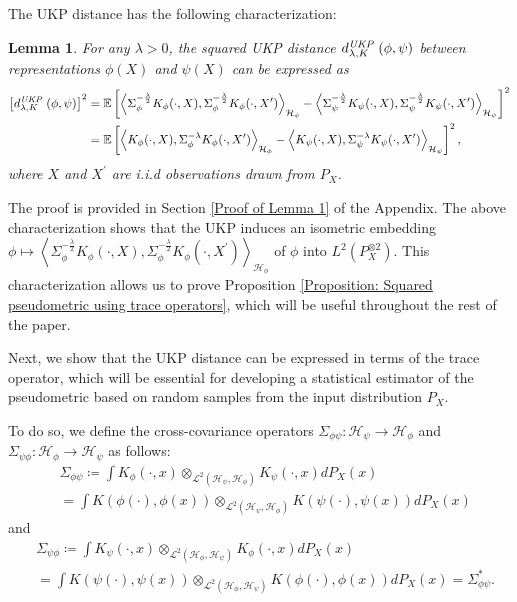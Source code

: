 \documentclass[11pt]{article}
\newcommand{\E}{\mathbb{E}}
\newcommand{\HS}{\mathcal{L}^{2}}
\newcommand{\repone}{\phi}
\newcommand{\reptwo}{\psi}
\newcommand{\Hone}{\mathcal{H}_{\phi}}
\newcommand{\Htwo}{\mathcal{H}_{\psi}}
\newcommand{\inprod}[1]{\left \langle #1 \right\rangle}
\newcommand{\metricstname}{UKP }
\theoremstyle{plain}
\newcounter{lemmano}
\newtheorem{lemma}[lemmano]{Lemma}
\begin{document}
The \metricstname distance has the following characterization:
\begin{lemma}\label{Characterization of pseudometric in terms of expected squared distance}
For any $\lambda>0$, the squared \metricstname distance $d_{\lambda,K}^{\emph{\metricstname}}(\repone,\reptwo)$ between representations $\repone(X)$ and $\reptwo(X)$ can be expressed as
\[
\begin{aligned}
     \left[d_{\lambda,K}^{\emph{\metricstname}}(\repone,\reptwo)\right]^{2}
    &= \E  \left[\inprod{\Sigma_{\repone}^{-\frac{\lambda}{2}}K_{\repone}(\cdot,X),\Sigma_{\repone}^{-\frac{\lambda}{2}}K_{\repone}(\cdot,X^{\prime})}_{\Hone} -\inprod{\Sigma_{\reptwo}^{-\frac{\lambda}{2}}K_{\reptwo}(\cdot,X),\Sigma_{\reptwo}^{-\frac{\lambda}{2}}K_{\reptwo}(\cdot,X^{\prime})}_{\Htwo}\right]^{2}\\
    & = \E  \left[\inprod{K_{\repone}(\cdot,X),\Sigma_{\repone}^{-\lambda}K_{\repone}(\cdot,X^{\prime})}_{\Hone} -\inprod{K_{\reptwo}(\cdot,X),\Sigma_{\reptwo}^{-\lambda}K_{\reptwo}(\cdot,X^{\prime})}_{\Htwo}\right]^{2},
\end{aligned}
\]
where $X$ and $X^{\prime}$ are i.i.d observations drawn from $P_{X}$.
\end{lemma}

The proof is provided in Section \ref{Proof of Lemma 1} of the Appendix. The above characterization shows that the \metricstname induces an isometric embedding $\repone \mapsto \inprod{\Sigma_{\repone}^{-\frac{\lambda}{2}}K_{\repone}(\cdot,X),\Sigma_{\repone}^{-\frac{\lambda}{2}}K_{\repone}(\cdot,X^{\prime})}_{\Hone}$ of $\repone$ into $L^{2}(P_{X}^{\otimes 2})$. This characterization allows us to prove Proposition \ref{Proposition: Squared pseudometric using trace operators}, which will be useful throughout the rest of the paper.

Next, we show that the \metricstname distance can be expressed in terms of the trace operator, which will be essential for developing a statistical estimator of the pseudometric based on random samples from the input distribution $P_{X}$. 

To do so, we define the cross-covariance operators $\Sigma_{\repone\reptwo}: \Htwo \to \Hone$ and $\Sigma_{\reptwo\repone}: \Hone \to \Htwo$ as follows:
\[
\begin{aligned}
    &\Sigma_{\repone\reptwo} \coloneq\int K_{\repone}(\cdot,x) \otimes_{\HS(\Htwo,\Hone)}  K_{\reptwo}(\cdot,x) dP_{X}(x)\\ &= \int K(\repone(\cdot),\repone(x)) \otimes_{\HS(\Htwo,\Hone)}  K(\reptwo(\cdot),\reptwo(x)) dP_{X}(x)
\end{aligned}
\]and
\[
\begin{aligned}
    &\Sigma_{\reptwo\repone} \coloneq \int K_{\reptwo}(\cdot,x) \otimes_{\HS(\Hone,\Htwo)} K_{\repone}(\cdot,x) dP_{X}(x)\\
    &= \int  K(\reptwo(\cdot),\reptwo(x))\otimes_{\HS(\Hone,\Htwo)}  K(\repone(\cdot),\repone(x))dP_{X}(x)
    = \Sigma_{\repone\reptwo}^{*}.
\end{aligned}
\]
\end{document}
